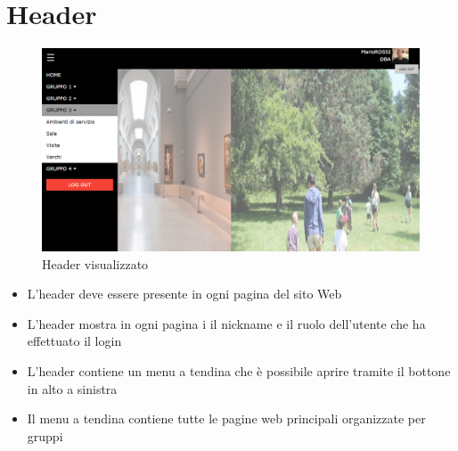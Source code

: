 \documentclass[a4paper, 12pt]{report}
\begin{document}
        \section{Header}
            \begin{figure}[htbt]
                \centering
                \includegraphics[scale=0.35]{Immagini/Header.png}
                \caption{Header visualizzato}                
            \end{figure}
            \begin{itemize}
                \item L'header deve essere presente in ogni pagina del sito Web
                \item L'header mostra in ogni pagina i il nickname e il ruolo dell'utente che ha effettuato il login
                \item L'header contiene un menu a tendina che è possibile aprire tramite il bottone in alto a sinistra
                \item Il menu a tendina contiene tutte le pagine web principali organizzate per gruppi 
            \end{itemize}
        \newpage
\end{document}
